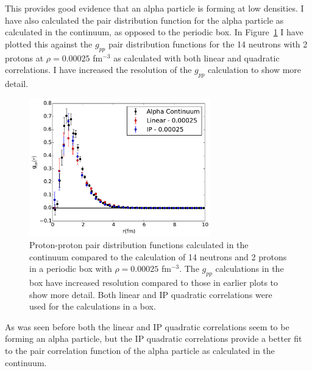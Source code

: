 This provides good evidence that an alpha particle is forming at low densities. I have also calculated the pair distribution function for the alpha particle as calculated in the continuum, as opposed to the periodic box. In Figure~\ref{fig:gpp_compare} I have plotted this against the $g_{pp}$ pair distribution functions for the 14 neutrons with 2 protons at $\rho=0.00025$ fm$^{-3}$ as calculated with both linear and quadratic correlations. I have increased the resolution of the $g_{pp}$ calculation to show more detail.
\begin{figure}[h!]
   \centering
   \includegraphics[width=0.7\textwidth]{figures/gpp_compare.pdf}
   \caption{Proton-proton pair distribution functions calculated in the continuum compared to the calculation of 14 neutrons and 2 protons in a periodic box with $\rho=0.00025$ fm$^{-3}$. The $g_{pp}$ calculations in the box have increased resolution compared to those in earlier plots to show more detail. Both linear and IP quadratic correlations were used for the calculations in a box.}
   \label{fig:gpp_compare}
\end{figure}
As was seen before both the linear and IP quadratic correlations seem to be forming an alpha particle, but the IP quadratic correlations provide a better fit to the pair correlation function of the alpha particle as calculated in the continuum.

